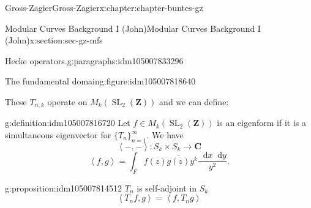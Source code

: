 \documentclass[oneside,10pt,]{book}
\numberwithin{equation}{section}
\newcommand{\diff}{\mathop{}\!\mathrm{d}}
\newcommand{\pair}[2]{\left\langle #1, #2 \right\rangle}
\newcommand{\ZZ}{\mathbf{Z}}
\newcommand{\CC}{\mathbf{C}}
\DeclareMathOperator{\SL}{SL}
\begin{document}
\begin{chapterptx}{Gross-Zagier}{}{Gross-Zagier}{}{}{x:chapter:chapter-buntes-gz}
\begin{sectionptx}{Modular Curves Background I (John)}{}{Modular Curves Background I (John)}{}{}{x:section:sec-gz-mfs}
\begin{paragraphs}{Hecke operators.}{g:paragraphs:idm105007833296}
\begin{figureptx}{The fundamental domain}{g:figure:idm105007818640}{}
\begin{image}{0}{1}{0}
{
}%
\end{image}%
\tcblower
\end{figureptx}%
These \(T_{n,k}\) operate on \(M_k(\SL_2(\ZZ))\) and we can define:%
\begin{definition}{}{g:definition:idm105007816720}%
Let \(f\in M_k(\SL_2(\ZZ))\) is an eigenform if it is a simultaneous eigenvector for \(\{T_n\}_{n=1}^\infty \). We have%
\begin{equation*}
\pair - - \colon  S_k \times S_k\to \CC
\end{equation*}
%
\begin{equation*}
\pair fg = \int_F f(z) \overline{g(z)} y^k \frac{\diff x \diff y}{y^2}\text{.}
\end{equation*}
%
\end{definition}
\begin{proposition}{}{}{g:proposition:idm105007814512}%
\(T_n\) is self-adjoint in \(S_k\)%
\begin{equation*}
\pair{T_n f}{g}=  \pair {f}{T_ng} 
\end{equation*}

\end{proposition}
\end{paragraphs}
\end{sectionptx}
\end{chapterptx}
\end{document}
